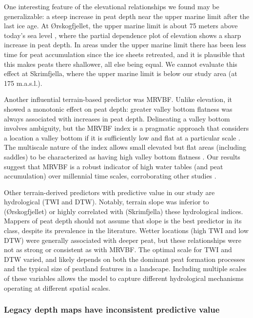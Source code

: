 \documentclass[soil, manuscript]{copernicus}
\begin{document}
One interesting feature of the elevational relationships we found may be generalizable: a steep increase in peat depth near the upper marine limit after the last ice age.
At Ørskogfjellet, the upper marine limit is about 75 meters above today's sea level \citep[Geological Survey of Norway,][]{hogaasDatabaseRegistreringAv2012}, where the partial dependence plot of elevation shows a sharp increase in peat depth.
In areas under the upper marine limit there has been less time for peat accumulation since the ice sheets retreated, and it is plausible that this makes peats there shallower, all else being equal.
We cannot evaluate this effect at Skrimfjella, where the upper marine limit is below our study area (at 175 m.a.s.l.).

Another influential terrain-based predictor was MRVBF.
Unlike elevation, it showed a monotonic effect on peat depth: greater valley bottom flatness was always associated with increases in peat depth.
Delineating a valley bottom involves ambiguity, but the MRVBF index is a pragmatic approach that considers a location a valley bottom if it is sufficiently low and flat at a particular scale \citep{gallantMultiresolutionIndexValley2003}.
The multiscale nature of the index allows small elevated but flat areas (including saddles) to be characterized as having high valley bottom flatness \citep{gallantMultiresolutionIndexValley2003}.
Our results suggest that MRVBF is a robust indicator of high water tables (and peat accumulation) over millennial time scales, corroborating other studies \citep{rudiyantoOpenDigitalMapping2018, deragonMappingMaximumPeat2023}.

Other terrain-derived predictors with predictive value in our study are hydrological (TWI and DTW).
Notably, terrain slope was inferior to (Ørskogfjellet) or highly correlated with (Skrimfjella) these hydrological indices.
Mappers of peat depth should not assume that slope is the best predictor in its class, despite its prevalence in the literature.
Wetter locations (high TWI and low DTW) were generally associated with deeper peat, but these relationships were not as strong or consistent as with MRVBF.
The optimal scale for TWI and DTW varied, and likely depends on both the dominant peat formation processes and the typical size of peatland features in a landscape.
Including multiple scales of these variables allows the model to capture different hydrological mechanisms operating at different spatial scales.

\subsubsection{Legacy depth maps have inconsistent predictive value}
\end{document}
